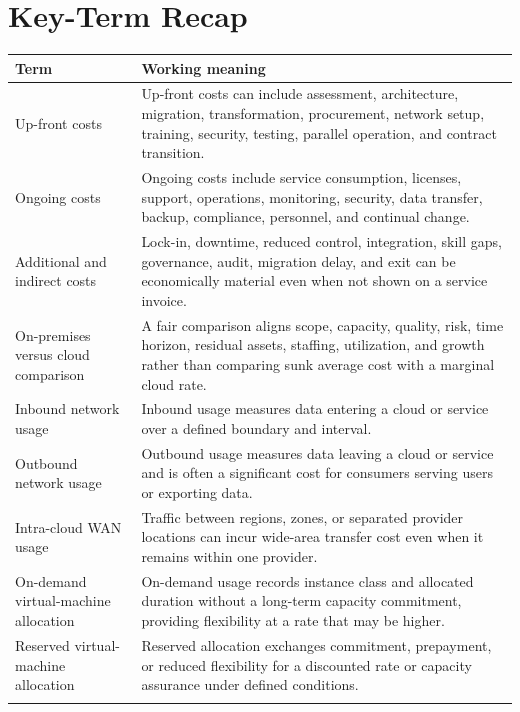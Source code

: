 \documentclass[11pt]{article}
\begin{document}
\section{Key-Term Recap}
\begin{longtable}{@{}>{\RaggedRight\arraybackslash}p{}>{\RaggedRight\arraybackslash}p{}@{}}
\toprule\rowcolor{Navy}\color{white}\textbf{Term} & \color{white}\textbf{Working meaning}\\\midrule\endhead
Up-front costs & Up-front costs can include assessment, architecture, migration, transformation, procurement, network setup, training, security, testing, parallel operation, and contract transition. \\\addlinespace[2pt]
Ongoing costs & Ongoing costs include service consumption, licenses, support, operations, monitoring, security, data transfer, backup, compliance, personnel, and continual change. \\\addlinespace[2pt]
Additional and indirect costs & Lock-in, downtime, reduced control, integration, skill gaps, governance, audit, migration delay, and exit can be economically material even when not shown on a service invoice. \\\addlinespace[2pt]
On-premises versus cloud comparison & A fair comparison aligns scope, capacity, quality, risk, time horizon, residual assets, staffing, utilization, and growth rather than comparing sunk average cost with a marginal cloud rate. \\\addlinespace[2pt]
Inbound network usage & Inbound usage measures data entering a cloud or service over a defined boundary and interval. \\\addlinespace[2pt]
Outbound network usage & Outbound usage measures data leaving a cloud or service and is often a significant cost for consumers serving users or exporting data. \\\addlinespace[2pt]
Intra-cloud WAN usage & Traffic between regions, zones, or separated provider locations can incur wide-area transfer cost even when it remains within one provider. \\\addlinespace[2pt]
On-demand virtual-machine allocation & On-demand usage records instance class and allocated duration without a long-term capacity commitment, providing flexibility at a rate that may be higher. \\\addlinespace[2pt]
Reserved virtual-machine allocation & Reserved allocation exchanges commitment, prepayment, or reduced flexibility for a discounted rate or capacity assurance under defined conditions. \\\addlinespace[2pt]

\end{longtable}
\end{document}
